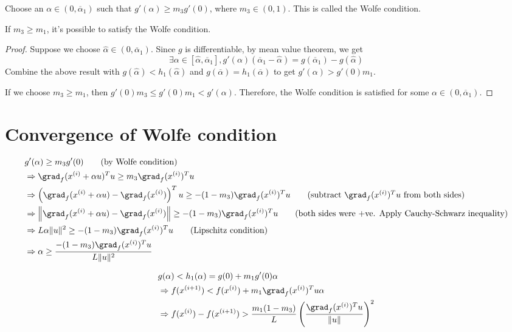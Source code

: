 Choose an $\alpha \in (0, \overline{\alpha}_1)$
such that $g'(\alpha) \ge m_3g'(0)$, where $m_3 \in (0, 1)$.
This is called the Wolfe condition.

\begin{theorem}
If $m_3 \ge m_1$, it's possible to satisfy the Wolfe condition.
\end{theorem}
\begin{proof}
Suppose we choose $\widehat{\alpha} \in (0, \overline{\alpha}_1)$.
Since $g$ is differentiable, by mean value theorem, we get
\[ \exists \alpha \in [\widehat{\alpha}, \overline{\alpha}_1],
    g'(\alpha)(\overline{\alpha}_1 - \widehat{\alpha}) = g(\overline{\alpha}_1) - g(\widehat{\alpha}) \]
Combine the above result with $g(\widehat{\alpha}) < h_1(\widehat{\alpha})$
and $g(\overline{\alpha}) = h_1(\overline{\alpha})$ to get $g'(\alpha) > g'(0)m_1$.

If we choose $m_3 \ge m_1$, then $g'(0)m_3 \le g'(0)m_1 < g'(\alpha)$.
Therefore, the Wolfe condition is satisfied for some
$\alpha \in (0, \overline{\alpha}_1)$.
\end{proof}

\section{Convergence of Wolfe condition}

\begin{align*}
& g'(\alpha) \ge m_3g'(0) \tag{by Wolfe condition}
\\ &\Rightarrow \grad_f(x^{(i)} + \alpha u)^T u \ge m_3 \grad_f(x^{(i)})^T u
\\ &\Rightarrow \left(\grad_f(x^{(i)} + \alpha u) - \grad_f(x^{(i)})\right)^T u \ge -(1-m_3) \grad_f(x^{(i)})^T u
    \tag{subtract $\grad_f(x^{(i)})^T u$ from both sides}
\\ &\Rightarrow \left\| \grad_f(x^{(i)} + \alpha u) - \grad_f(x^{(i)}) \right\| \ge -(1-m_3) \grad_f(x^{(i)})^T u
    \tag{both sides were +ve. Apply Cauchy-Schwarz inequality}
\\ &\Rightarrow L\alpha\|u\|^2 \ge -(1-m_3) \grad_f(x^{(i)})^T u
    \tag{Lipschitz condition}
\\ &\Rightarrow \alpha \ge \frac{-(1-m_3)\grad_f(x^{(i)})^T u}{L\|u\|^2}
\end{align*}

\begin{align*}
& g(\alpha) < h_1(\alpha) = g(0) + m_1 g'(0) \alpha
\\ &\Rightarrow f(x^{(i+1)}) < f(x^{(i)}) + m_1 \grad_f(x^{(i)})^T u \alpha
\\ &\Rightarrow f(x^{(i)}) - f(x^{(i+1)})
    > \frac{m_1(1-m_3)}{L} \left(\frac{\grad_f(x^{(i)})^Tu}{\|u\|}\right)^2
\end{align*}

